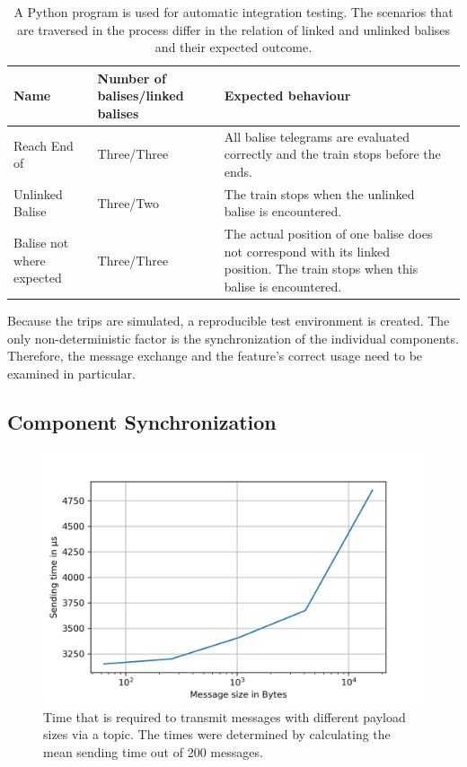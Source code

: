\begin{table}[h!]
	\begin{center}
		\caption{A Python program is used for automatic integration testing. The scenarios that are traversed in the process differ in the relation of linked and unlinked balises and their expected outcome.}
		\label{tab:stateQOS}
		\begin{tabularx}{\textwidth}{|X|X|X|X|}
			\hline
			\textbf{Name} & \textbf{Number of balises/linked balises} & \textbf{Expected behaviour}\\
			\hline \hline
			Reach End of \abr{MA} & Three/Three & All balise telegrams are evaluated correctly and the train stops before the \abr{MA} ends. \\
			\hline
			Unlinked Balise & Three/Two & The train stops when the unlinked balise is encountered. \\
			\hline
			Balise not where expected & Three/Three & The actual position of one balise does not correspond with its linked position. The train stops when this balise is encountered. \\
			\hline
		\end{tabularx}
	\end{center}
\end{table}

Because the trips are simulated, a reproducible test environment is created.
The only non-deterministic factor is the synchronization of the individual components.
Therefore, the message exchange and the  feature's correct usage need to be examined in particular.

\subsection{Component Synchronization}
\begin{figure}[!hb]
	\centering
	\includegraphics[width=0.75\linewidth]{images/plots/sendingTimes}
	\caption{Time that is required to transmit messages with different payload sizes via a  topic. The times were determined by calculating the mean sending time out of 200 messages.}
	\label{fig:PlotSendingTimes}
\end{figure}

